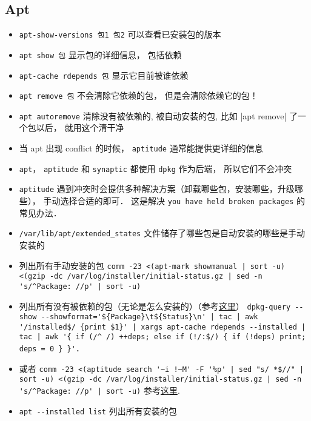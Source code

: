 
\begin{issues}
\issueDraft
\end{issues}

\subsection{Apt}
\begin{itemize}
\item \verb|apt-show-versions 包1 包2| 可以查看已安装包的版本
\item \verb|apt show 包| 显示包的详细信息， 包括依赖
\item \verb|apt-cache rdepends 包| 显示它目前被谁依赖
\item \verb|apt remove 包| 不会清除它依赖的包， 但是会清除依赖它的包！
\item \verb|apt autoremove| 清除没有被依赖的, 被自动安装的包, 比如 \ver|apt remove| 了一个包以后， 就用这个清干净
\item 当 apt 出现 conflict 的时候， \verb|aptitude| 通常能提供更详细的信息
\item \verb|apt|， \verb|aptitude| 和 \verb|synaptic| 都使用 \verb|dpkg| 作为后端， 所以它们不会冲突
\item \verb|aptitude| 遇到冲突时会提供多种解决方案（卸载哪些包，安装哪些，升级哪些）， 手动选择合适的即可． 这是解决 \verb|you have held broken packages| 的常见办法．
\item \verb|/var/lib/apt/extended_states| 文件储存了哪些包是自动安装的哪些是手动安装的
\item 列出所有手动安装的包 \verb`comm -23 <(apt-mark showmanual | sort -u) <(gzip -dc /var/log/installer/initial-status.gz | sed -n 's/^Package: //p' | sort -u)`
\item 列出所有没有被依赖的包（无论是怎么安装的）（参考\href{https://askubuntu.com/questions/1114733/how-do-i-list-all-packages-that-no-package-depends-on}{这里}） \verb`dpkg-query --show --showformat='${Package}\t${Status}\n' | tac | awk '/installed$/ {print $1}' | xargs apt-cache rdepends --installed | tac | awk '{ if (/^ /) ++deps; else if (!/:$/) { if (!deps) print; deps = 0 } }'`．
\item 或者 \verb`comm -23 <(aptitude search '~i !~M' -F '%p' | sed "s/ *$//" | sort -u) <(gzip -dc /var/log/installer/initial-status.gz | sed -n 's/^Package: //p' | sort -u)` 参考\href{https://askubuntu.com/questions/2389/how-to-list-manually-installed-packages}{这里}.
\item \verb|apt --installed list| 列出所有安装的包

\end{itemize}
